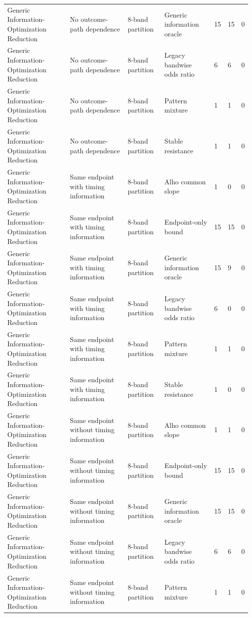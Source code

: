 \begin{tabular}{lllllll}
Generic Information-Optimization Reduction & No outcome-path dependence & 8-band partition & Generic information oracle & 15 & 15 & 0 \\
Generic Information-Optimization Reduction & No outcome-path dependence & 8-band partition & Legacy bandwise odds ratio & 6 & 6 & 0 \\
Generic Information-Optimization Reduction & No outcome-path dependence & 8-band partition & Pattern mixture & 1 & 1 & 0 \\
Generic Information-Optimization Reduction & No outcome-path dependence & 8-band partition & Stable resistance & 1 & 1 & 0 \\
Generic Information-Optimization Reduction & Same endpoint with timing information & 8-band partition & Alho common slope & 1 & 0 & 0 \\
Generic Information-Optimization Reduction & Same endpoint with timing information & 8-band partition & Endpoint-only bound & 15 & 15 & 0 \\
Generic Information-Optimization Reduction & Same endpoint with timing information & 8-band partition & Generic information oracle & 15 & 9 & 0 \\
Generic Information-Optimization Reduction & Same endpoint with timing information & 8-band partition & Legacy bandwise odds ratio & 6 & 0 & 0 \\
Generic Information-Optimization Reduction & Same endpoint with timing information & 8-band partition & Pattern mixture & 1 & 1 & 0 \\
Generic Information-Optimization Reduction & Same endpoint with timing information & 8-band partition & Stable resistance & 1 & 0 & 0 \\
Generic Information-Optimization Reduction & Same endpoint without timing information & 8-band partition & Alho common slope & 1 & 1 & 0 \\
Generic Information-Optimization Reduction & Same endpoint without timing information & 8-band partition & Endpoint-only bound & 15 & 15 & 0 \\
Generic Information-Optimization Reduction & Same endpoint without timing information & 8-band partition & Generic information oracle & 15 & 15 & 0 \\
Generic Information-Optimization Reduction & Same endpoint without timing information & 8-band partition & Legacy bandwise odds ratio & 6 & 6 & 0 \\
Generic Information-Optimization Reduction & Same endpoint without timing information & 8-band partition & Pattern mixture & 1 & 1 & 0 \\

\end{tabular}
